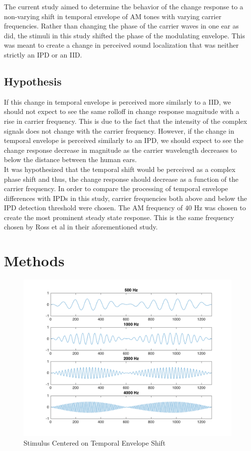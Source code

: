 \documentclass[12pt,journal,compsoc,twocolumn]{IEEEtran}
\begin{document}
The current study aimed to determine the behavior of the change response to a non-varying shift in temporal envelope of AM tones with varying carrier frequencies. Rather than changing the phase of the carrier waves in one ear as \cite{Ross2007} did, the stimuli in this study shifted the phase of the modulating envelope. This was meant to create a change in perceived sound localization that was neither strictly an IPD or an IID.

\subsection{Hypothesis}
If this change in temporal envelope is perceived more similarly to a IID, we should not expect to see the same rolloff in change response magnitude with a rise in carrier frequency. This is due to the fact that the intensity of the complex signals does not change with the carrier frequency. However, if the change in temporal envelope is perceived similarly to an IPD, we should expect to see the change response decrease in magnitude as the carrier wavelength decreases to below the distance between the human ears.\\

It was hypothesized that the temporal shift would be perceived as a complex phase shift and thus, the change response should decrease as a function of the carrier frequency. In order to compare the processing of temporal envelope differences with IPDs in this study, carrier frequencies both above and below the IPD detection threshold were chosen. The AM frequency of $40$ Hz was chosen to create the most prominent steady state response. This is the same frequency chosen by Ross et al in their aforementioned study.


\section{Methods}

\begin{figure}[t]
\centering
\includegraphics[width=3.5 in]{stimulus}
\caption{Stimulus Centered on Temporal Envelope Shift}
\label{fig:stimulus}
\end{figure}
 
\end{document}
